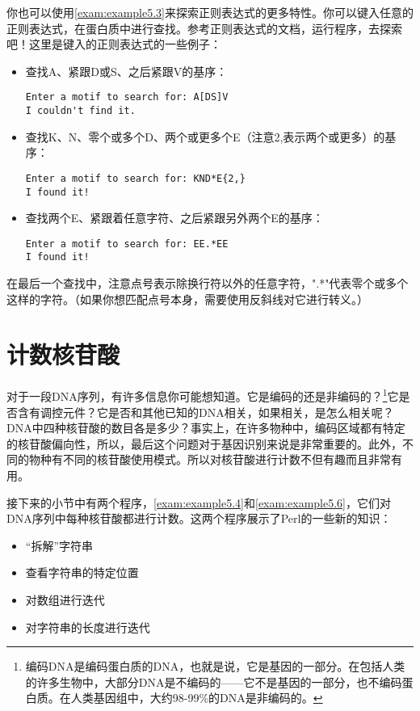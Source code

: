 你也可以使用\autoref{exam:example5.3}来探索正则表达式的更多特性。你可以键入任意的正则表达式，在蛋白质中进行查找。参考正则表达式的文档，运行程序，去探索吧！这里是键入的正则表达式的一些例子：

\begin{itemize}
  \item 查找A、紧跟D或S、之后紧跟V的基序：
\begin{lstlisting}
Enter a motif to search for: A[DS]V
I couldn't find it.
\end{lstlisting}
  \item 查找K、N、零个或多个D、两个或更多个E（注意{2,}表示两个或更多）的基序：
\begin{lstlisting}
Enter a motif to search for: KND*E{2,}
I found it!
\end{lstlisting}
  \item 查找两个E、紧跟着任意字符、之后紧跟另外两个E的基序：
\begin{lstlisting}
Enter a motif to search for: EE.*EE
I found it!
\end{lstlisting}
\end{itemize}

在最后一个查找中，注意点号表示除换行符以外的任意字符，".*"代表零个或多个这样的字符。（如果你想匹配点号本身，需要使用反斜线对它进行转义。）

\section{计数核苷酸}
对于一段DNA序列，有许多信息你可能想知道。它是编码的还是非编码的？\footnote{编码DNA是编码蛋白质的DNA，也就是说，它是基因的一部分。在包括人类的许多生物中，大部分DNA是不编码的——它不是基因的一部分，也不编码蛋白质。在人类基因组中，大约98-99\%的DNA是非编码的。}它是否含有调控元件？它是否和其他已知的DNA相关，如果相关，是怎么相关呢？DNA中四种核苷酸的数目各是多少？事实上，在许多物种中，编码区域都有特定的核苷酸偏向性，所以，最后这个问题对于基因识别来说是非常重要的。此外，不同的物种有不同的核苷酸使用模式。所以对核苷酸进行计数不但有趣而且非常有用。

接下来的小节中有两个程序，\autoref{exam:example5.4}和\autoref{exam:example5.6}，它们对DNA序列中每种核苷酸都进行计数。这两个程序展示了Perl的一些新的知识：

\begin{itemize}
  \item “拆解”字符串
  \item 查看字符串的特定位置
  \item 对数组进行迭代
  \item 对字符串的长度进行迭代
\end{itemize}

